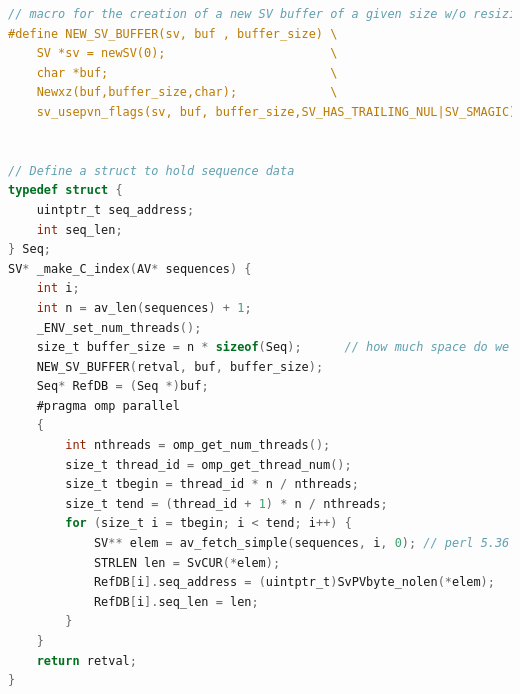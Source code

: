 \documentclass[10pt]{article}
\begin{document}
\noindent\hspace{0.05\linewidth}\begin{minipage}{0.90\textwidth}
\begin{lstlisting}[language=C,basicstyle=\footnotesize,frame=none,caption={Pre-work to access Perl strings in C.},label={lst:SeqDBInC},captionpos=b]
// macro for the creation of a new SV buffer of a given size w/o resizing
#define NEW_SV_BUFFER(sv, buf , buffer_size) \
    SV *sv = newSV(0);                       \
    char *buf;                               \
    Newxz(buf,buffer_size,char);             \
    sv_usepvn_flags(sv, buf, buffer_size,SV_HAS_TRAILING_NUL|SV_SMAGIC)


// Define a struct to hold sequence data
typedef struct {
    uintptr_t seq_address;
    int seq_len;
} Seq;
SV* _make_C_index(AV* sequences) {
    int i;
    int n = av_len(sequences) + 1;
    _ENV_set_num_threads();
    size_t buffer_size = n * sizeof(Seq);      // how much space do we need?
    NEW_SV_BUFFER(retval, buf, buffer_size);
    Seq* RefDB = (Seq *)buf;
    #pragma omp parallel
    {
        int nthreads = omp_get_num_threads();
        size_t thread_id = omp_get_thread_num();
        size_t tbegin = thread_id * n / nthreads;
        size_t tend = (thread_id + 1) * n / nthreads;
        for (size_t i = tbegin; i < tend; i++) {
            SV** elem = av_fetch_simple(sequences, i, 0); // perl 5.36 and above
            STRLEN len = SvCUR(*elem);
            RefDB[i].seq_address = (uintptr_t)SvPVbyte_nolen(*elem);
            RefDB[i].seq_len = len;
        }
    }
    return retval;
}
\end{lstlisting}
\end{minipage}
\end{document}
